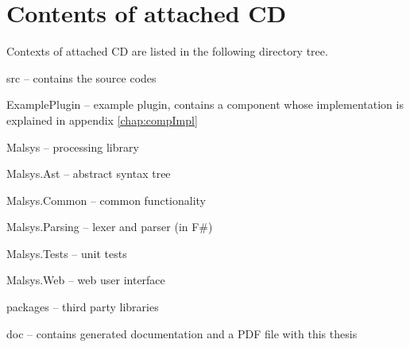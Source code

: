 
\chapter{Contents of attached CD}
\label{chap:attachedCd}

Contexts of attached CD are listed in the following directory tree.

\begin{description*}

	\item[src] -- contains the source codes
		\begin{description*}
			\item[ExamplePlugin] -- example plugin, contains a component whose implementation is explained in appendix \ref{chap:compImpl}
			\item[Malsys] -- \lsystem processing library
			\item[Malsys.Ast] -- abstract syntax tree
			\item[Malsys.Common] -- common functionality
			\item[Malsys.Parsing] -- lexer and parser (in F\#)
			\item[Malsys.Tests]	-- unit tests
			\item[Malsys.Web] -- web user interface
			\item[packages] -- third party libraries
		\end{description*}
	\item[doc] -- contains generated documentation and a PDF file with this thesis
\end{description*}










